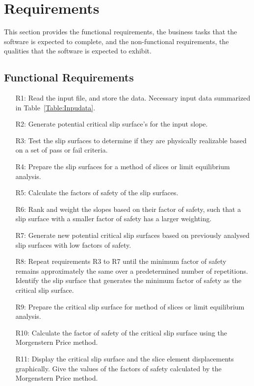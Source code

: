 \documentclass[12pt]{article}
\begin{document}
\section{Requirements}
\label{Sec:Requ}
This section provides the functional requirements, the business tasks that the software is expected to complete, and the non-functional requirements, the qualities that the software is expected to exhibit.
\subsection{Functional Requirements}
\label{Sec:FuncRequ}
\begin{itemize}
\item[R1:]Read the input file, and store the data. Necessary input data summarized in Table~\ref{Table:Inpudata}.
\item[R2:]Generate potential critical slip surface's for the input slope.
\item[R3:]Test the slip surfaces to determine if they are physically realizable based on a set of pass or fail criteria.
\item[R4:]Prepare the slip surfaces for a method of slices or limit equilibrium analysis.
\item[R5:]Calculate the factors of safety of the slip surfaces.
\item[R6:]Rank and weight the slopes based on their factor of safety, such that a slip surface with a smaller factor of safety has a larger weighting.
\item[R7:]Generate new potential critical slip surfaces based on previously analysed slip surfaces with low factors of safety.
\item[R8:]Repeat requirements R3 to R7 until the minimum factor of safety remains approximately the same over a predetermined number of repetitions. Identify the slip surface that generates the minimum factor of safety as the critical slip surface.
\item[R9:]Prepare the critical slip surface for method of slices or limit equilibrium analysis.
\item[R10:]Calculate the factor of safety of the critical slip surface using the Morgenstern Price method.
\item[R11:]Display the critical slip surface and the slice element displacements graphically. Give the values of the factors of safety calculated by the Morgenstern Price method.
\end{itemize}
\end{document}
